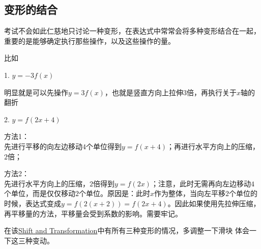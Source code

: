 \subsection*{变形的结合}
\label{subsec:Combination of Transformation}
考试不会如此仁慈地只讨论一种变形，在表达式中常常会将多种变形结合在一起，重要的是能够确定执行那些操作，以及这些操作的量。

比如

1. $y=-3f(x)$ 

明显就是可以先操作$y=3f(x)$，也就是竖直方向上拉伸$3$倍，再执行关于$x$轴的翻折

2. $y=f(2x+4)$

方法1：\\
先进行平移的向左边移动$4$个单位得到$y=f(x+4)$；再进行水平方向上的压缩，$2$倍；

方法2：\\
先进行水平方向上的压缩，$2$倍得到$y=f(2x)$；注意，此时无需再向左边移动$4$个单位，而是仅仅移动$2$个单位。原因是：此时$x$作为整体，当向左平移$2$个单位的时候，表达式变成$y=f(2\boxed{(x+2)})=f(2x+4)$。因此如果使用先拉伸压缩，再平移量的方法，平移量会受到系数的影响。需要牢记。

在该\href{https://www.desmos.com/calculator/6yzdqimnlc}{Shift and Transformation}中有所有三种变形的情况，多调整一下滑块
体会一下这三种变动。




